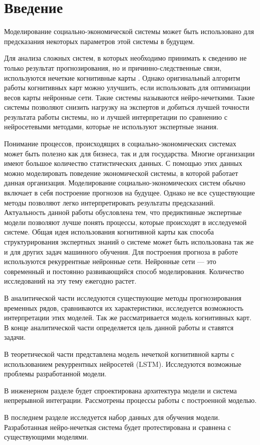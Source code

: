 \chapter*{Введение}
\label{sec:afterwords}

Моделирование социально-экономической системы может быть использовано для предсказания
некоторых параметров этой системы в будущем.

Для анализа сложных систем, в которых необходимо принимать к сведению
не только результат прогнозирования, но и причинно-следственные связи,
используются нечеткие когнитивные карты \cite{osoba2019dags} \cite{kosko1986fuzzy}.
Однако оригинальный алгоритм работы когнитивных карт можно улучшить,
если использовать для оптимизации весов карты нейронные сети.
Такие системы называются нейро-нечеткими.
Такие системы позволяют снизить нагрузку на экспертов и
добиться лучшей точности результата работы системы, но и лучшей интерпретации по сравнению
с нейросетевыми методами, которые не используют экспертные знания.

Понимание процессов, происходящих в социально-экономических системах
может быть полезно как для бизнеса, так и для государства.
Многие организации имеют большое количество статистических данных.
С помощью этих данных можно моделировать поведение
экономической системы, в которой работает данная организация.
Моделирование социально-экономических систем обычно
включает в себя построение прогнозов на будущее.
Однако не все существующие методы позволяют
легко интерпретировать результаты предсказаний.
Актуальность данной работы обусловлена тем, что предиктивные экспертные модели
позволяют лучше понять процессы, которые происходят в
исследуемой системе. Общая идея использования когнитивной карты
как способа структурирования экспертных знаний о системе
может быть использована так же и для других задач машинного обучения.
Для построения прогноза в работе используются рекуррентные нейронные
сети. Нейронные сети --- это современный и постоянно
развивающийся способ моделирования. Количество исследований
на эту тему ежегодно растет.

В аналитической части исследуются существующие методы прогнозирования
временных рядов, сравниваются их характеристики, исследуется
возможность интерпретации этих моделей. Так же рассматривается
модель когнитивных карт. В конце аналитической части определяется
цель данной работы и ставятся задачи.

В теоретической части представлена модель нечеткой когнитивной карты с использованием
рекуррентных нейросетей (LSTM). Исследуются возможные проблемы разработанной модели.

В инженерном разделе будет спроектирована архитектура модели и
система непрерывной интеграции. Рассмотрены процессы работы с построенной моделью.

В последнем разделе исследуется набор данных для обучения модели.
Разработанная нейро-нечеткая система будет протестирована и сравнена
с существующими моделями.